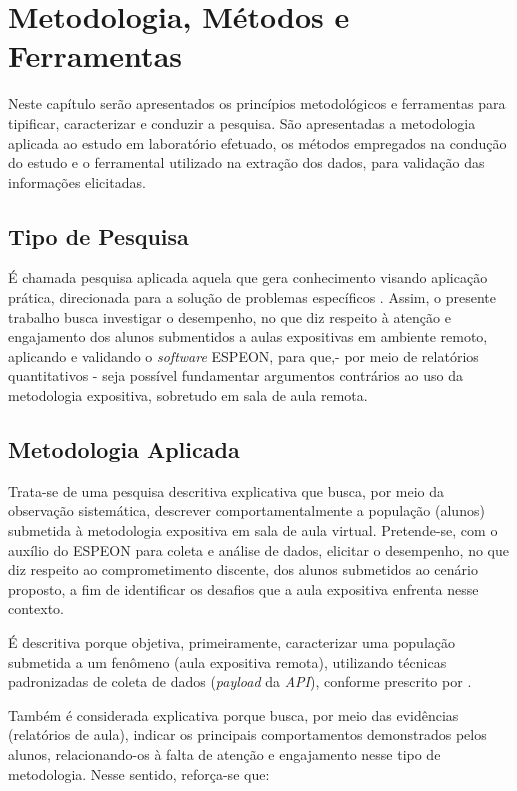 \chapter{Metodologia, Métodos e Ferramentas} \label{sec:methodology}
Neste capítulo serão apresentados os princípios metodológicos e ferramentas para tipificar, caracterizar e conduzir a pesquisa. São apresentadas a metodologia aplicada ao estudo em laboratório efetuado, os métodos empregados na condução do estudo e o ferramental utilizado na extração dos dados, para validação das informações elicitadas.

\section{Tipo de Pesquisa}
É chamada pesquisa aplicada aquela que gera conhecimento visando aplicação prática, direcionada para a solução de problemas específicos \cite{sienaMetodologiaPesquisaCientifica2024}. Assim, o presente trabalho busca investigar o desempenho, no que diz respeito à atenção e engajamento dos alunos submentidos a aulas expositivas em ambiente remoto, aplicando e validando o \textit{software} ESPEON, para que,- por meio de relatórios quantitativos - seja possível fundamentar argumentos contrários ao uso da metodologia expositiva, sobretudo em sala de aula remota.

\section{Metodologia Aplicada}
Trata-se de uma pesquisa descritiva explicativa que busca, por meio da observação sistemática, descrever comportamentalmente a população (alunos) submetida à metodologia expositiva em sala de aula virtual. Pretende-se, com o auxílio do ESPEON para coleta e análise de dados, elicitar o desempenho, no que diz respeito ao comprometimento discente, dos alunos submetidos ao cenário proposto, a fim de identificar os desafios que a aula expositiva enfrenta nesse contexto.

É descritiva porque objetiva, primeiramente, caracterizar uma população submetida a um fenômeno (aula expositiva remota), utilizando técnicas padronizadas de coleta de dados (\textit{payload} da \textit{API}), conforme prescrito por \cite{gilComoElaborarProjetos2008a}.

Também é considerada explicativa porque busca, por meio das evidências (relatórios de aula), indicar os principais comportamentos demonstrados pelos alunos, relacionando-os à falta de atenção e engajamento nesse tipo de metodologia. Nesse sentido, reforça-se que:

